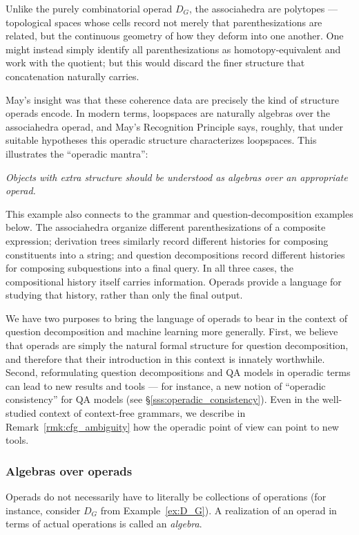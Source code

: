 \documentclass{article}
\theoremstyle{plain}
\theoremstyle{definition}
\theoremstyle{remark}
\theoremstyle{definition}
\begin{document}
Unlike the purely combinatorial operad $D_G$, the associahedra are polytopes --- topological spaces whose cells record not merely that parenthesizations are related, but the continuous geometry of how they deform into one another.
One might instead simply identify all parenthesizations as homotopy-equivalent and work with the quotient; but this would discard the finer structure that concatenation naturally carries.

May's insight was that these coherence data are precisely the kind of structure operads encode.
In modern terms, loopspaces are naturally algebras over the associahedra operad, and May's Recognition Principle says, roughly, that under suitable hypotheses this operadic structure characterizes loopspaces. This illustrates the ``operadic mantra'':
\begin{center}
{\it
Objects with extra structure should be understood as algebras over an appropriate operad.}
\end{center}
This example also connects to the grammar and question-decomposition examples below.
The associahedra organize different parenthesizations of a composite expression; derivation trees similarly record different histories for composing constituents into a string; and question decompositions record different histories for composing subquestions into a final query.
In all three cases, the compositional history itself carries information.
Operads provide a language for studying that history, rather than only the final output.

We have two purposes to bring the language of operads to bear in the context of question decomposition and machine learning more generally.
First, we believe that operads are simply the natural formal structure for question decomposition, and therefore that their introduction in this context is innately worthwhile.
Second, reformulating question decompositions and QA models in operadic terms can lead to new results and tools --- for instance, a new notion of ``operadic consistency'' for QA models (see \S\ref{sss:operadic_consistency}).
Even in the well-studied context of context-free grammars, we describe in Remark~\ref{rmk:cfg_ambiguity} how the operadic point of view can point to new tools.

\subsubsection{Algebras over operads}
\label{sss:algebras}

Operads do not necessarily have to literally be collections of operations (for instance, consider $D_G$ from Example~\ref{ex:D_G}).
A realization of an operad in terms of actual operations is called an \emph{algebra}.
\end{document}
